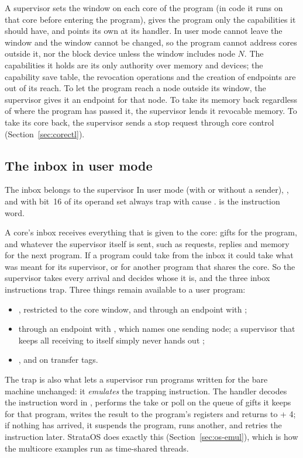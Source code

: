 A supervisor sets the window on each core of the program (in code it runs on that core before entering
the program), gives the program only the capabilities it should have, and points its own  at
its handler. In user mode  cannot leave the window and the window cannot be changed, so
the program cannot address cores outside it, nor the block device unless the window includes node $N$.
The capabilities it holds are its only authority over memory and devices; the capability save table,
the revocation operations and the creation of endpoints are out of its reach. To let the program reach a
node outside its window, the supervisor gives it an endpoint for that node. To take its memory back
regardless of where the program has passed it, the supervisor lends it revocable memory. To take its core back, the supervisor sends a stop request through core control
(Section~\ref{sec:corectl}).

\subsection{The inbox in user mode}\label{sec:userinbox}

\begin{rule*}{The inbox belongs to the supervisor}
In user mode  (with or without a sender), , and  with bit~16 of its
operand set always trap with cause .  is the instruction word.
\end{rule*}

A core's inbox receives everything that is given to the core: gifts for the program, and whatever the
supervisor itself is sent, such as requests, replies and memory for the next program. If a program
could take from the inbox it could take what was meant for its supervisor, or for another program that
shares the core. So the supervisor takes every arrival and decides whose it is, and the three inbox
instructions trap. Three things remain available to a user program:
\begin{itemize}
\item {}, restricted to the core window, and  through an endpoint with ;
\item {} through an endpoint with , which names one sending node; a supervisor that
  keeps all receiving to itself simply never hands out ;
\item {},  and  on transfer tags.
\end{itemize}

The  trap is also what lets a supervisor run programs written for the bare machine
unchanged: it \emph{emulates} the trapping instruction. The handler decodes the instruction word in
, performs the take or poll on the queue of gifts it keeps for that program, writes the
result to the program's registers and returns to  + 4; if nothing has arrived, it suspends the
program, runs another, and retries the instruction later. StrataOS does exactly this
(Section~\ref{sec:os-emul}), which is how the multicore examples run as time-shared threads.
